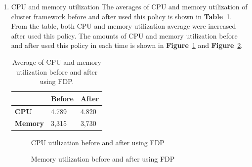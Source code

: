 \documentclass[12pt,oneside,openright,a4paper]{cpe-english-project}
\begin{document}
\begin{enumerate}
\newpage
  \item CPU and memory utilization
  \newline
  The averages of CPU and memory utilization of cluster framework before and after used this policy is shown in \textbf{Table}~\ref{tbl:po1CPUMem}. From the table, both CPU and memory utilization average were increased after used this policy. The amounts of CPU and memory utilization before and after used this policy in each time is shown in \textbf{Figure}~\ref{fig:cpu1} and \textbf{Figure}~\ref{fig:mem1}. 
  \begin{table}[!h]
  \caption{Average of CPU and memory utilization before and after using FDP.}\label{tbl:po1CPUMem}
  \begin{tabular}{@{}|p{}|p{}|p{}|}
   \hline
   \textbf{} & \textbf{Before} & \textbf{After} \\ 
   \hline
   \textbf{CPU} & 4.789 & 4.820 \\ 
   \hline
   \textbf{Memory} & 3,315 & 3,730 \\ 
   \hline                     
  \end{tabular}
\end{table}
\begin{figure}[!h]\centering
    \setlength{\fboxrule}{0mm} %
    \setlength{\fboxsep}{0cm}
    \caption{CPU utilization before and after using FDP}\label{fig:cpu1}
\end{figure}
\begin{figure}[!h]\centering
    \setlength{\fboxrule}{0mm} %
    \setlength{\fboxsep}{0cm}
    \caption{Memory utilization before and after using FDP}\label{fig:mem1}
\end{figure}


\end{enumerate}
\end{document}
